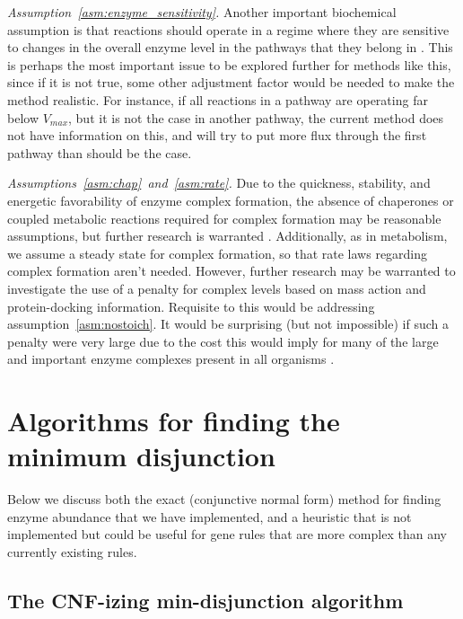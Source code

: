 \emph{Assumption~\ref{asm:enzyme_sensitivity}.}
Another important biochemical assumption is that reactions should
operate in a regime where they are sensitive to changes in the overall
enzyme level in the pathways that they belong in
\citep{Bennett2009,Chubukov2013}. This is perhaps the most important
issue to be explored further for methods like this, since if it is not
true, some other adjustment factor would be needed to make the method
realistic. For instance, if all reactions in a pathway are operating
far below $V_{max}$, but it is not the case in another pathway, the
current method does not have information on this, and will try to put
more flux through the first pathway than should be the case.

\emph{Assumptions~\ref{asm:chap}~and~\ref{asm:rate}.}
Due to the quickness, stability, and energetic favorability of enzyme
complex formation, the absence of chaperones or coupled metabolic
reactions required for complex formation may be reasonable
assumptions, but further research is warranted \citep{Karr2012}.
Additionally, as in metabolism, we assume a steady state for complex
formation, so that rate laws regarding complex formation aren't
needed. However, further research may be warranted to investigate the
use of a penalty for complex levels based on mass action and
protein-docking information. Requisite to this would be addressing
assumption~\ref{asm:nostoich}. It would be surprising (but not
impossible) if such a penalty were very large due to the cost this
would imply for many of the large and important enzyme complexes
present in all organisms \citep{Nelson2008}.

\section{Algorithms for finding the minimum disjunction}

Below we discuss both the exact (conjunctive normal form) method for
finding enzyme abundance that we have implemented, and a heuristic that
is not implemented but could be useful for gene rules that are more
complex than any currently existing rules.

\subsection{The CNF-izing min-disjunction algorithm}


